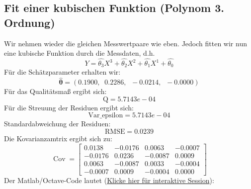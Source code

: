 \subsection{Fit einer kubischen Funktion (Polynom 3. Ordnung)}
Wir nehmen wieder die gleichen Messwertpaare wie eben. Jedoch fitten wir 
nun eine kubische Funktion durch die Messdaten, d.h. 
\begin{equation}
Y = \hat{\theta_3} X^3 + \hat{\theta_2} X^2 + \hat{\theta_1} X^1 +
\hat{\theta_0} 
\end{equation}
Für die Schätzparameter erhalten wir: 
\[\hat{\boldsymbol\theta} = 
(0.1900, \;\; 0.2286,\;\; -0.0214, \;\; -0.0000) \]
Für das Qualitätsmaß ergibt sich: 
\[\mathrm{Q} = 5.7143e-04 \]
Für die Streuung der Residuen ergibt sich: 
\[\mathrm{Var\_epsilon} = 5.7143e-04 \]
Standardabweichung der Residuen: 
\[
\mathrm{RMSE} = 0.0239 \]
Die Kovarianzamtrix ergibt sich zu: 
\[
\operatorname{Cov} =
\begin{bmatrix}
0.0138  & -0.0176  &  0.0063  & -0.0007 \\
-0.0176 &   0.0236 &  -0.0087 &  0.0009 \\
0.0063  &  -0.0087 &   0.0033 &  -0.0004 \\
-0.0007 &   0.0009 &  -0.0004  &  0.0000
\end{bmatrix}
\]
Der Matlab/Octave-Code lautet (\href{https://mybinder.org/v2/gh/dhueser/MDA-Vorlesung-iprom-tu-bs/master?urlpath=/lab/tree/vorlesung/02_vorlesung/code/cubic_fit.ipynb}{Klicke hier für interaktive Session}): 


